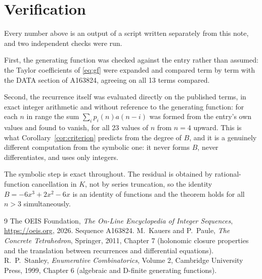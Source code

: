\documentclass[11pt,a4paper]{article}
\theoremstyle{plain}
\theoremstyle{definition}
\begin{document}
\section{Verification}

Every number above is an output of a script written separately from this note, and two
independent checks were run.

First, the generating function was checked against the entry rather than assumed: the
Taylor coefficients of \eqref{eq:gf} were expanded and compared term by term with the DATA
section of A163824, agreeing on all 13 terms compared.

Second, the recurrence itself was evaluated directly on the published terms, in exact
integer arithmetic and without reference to the generating function: for each $n$ in range
the sum $\sum_{i}p_{i}(n)a(n-i)$ was formed from the entry's own values and found to
vanish, for all 23 values of $n$ from $n=4$ upward. This is what
Corollary~\ref{cor:criterion} predicts from the degree of $B$, and it is a genuinely
different computation from the symbolic one: it never forms $B$, never differentiates, and
uses only integers.

The symbolic step is exact throughout. The residual is obtained by rational-function
cancellation in $K$, not by series truncation, so the identity $B=- 6 x^{3} + 2 x^{2} - 6 x$ is an
identity of functions and the theorem holds for all $n>3$ simultaneously.

\begin{thebibliography}{9}
 The OEIS Foundation, \emph{The On-Line Encyclopedia of Integer Sequences},
\url{https://oeis.org}, 2026. Sequence A163824.
 M.~Kauers and P.~Paule, \emph{The Concrete Tetrahedron}, Springer, 2011,
Chapter 7 (holonomic closure properties and the translation between recurrences and
differential equations).
 R.~P.~Stanley, \emph{Enumerative Combinatorics}, Volume 2, Cambridge
University Press, 1999, Chapter 6 (algebraic and D-finite generating functions).
\end{thebibliography}
\end{document}
